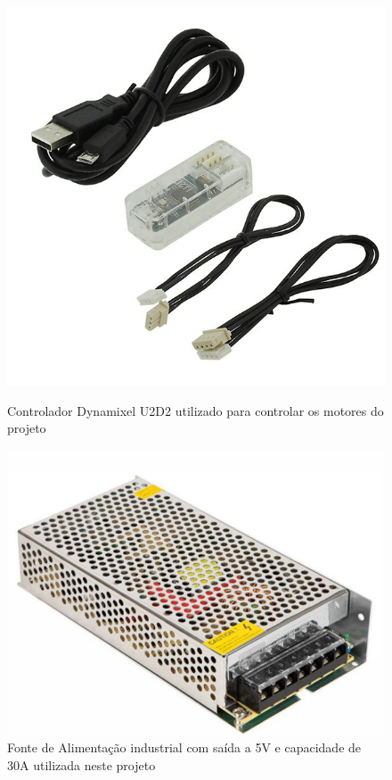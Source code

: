 \begin{figure}[H]
    \centering
    \begin{minipage}[b]{0.45\textwidth}
        \centering
        \includegraphics[width=\textwidth]{figs/chapter3/u2d2.jpg}
        \caption{Controlador Dynamixel U2D2 utilizado para controlar os motores do projeto}
        \label{fig:u2d2}
    \end{minipage}
    \hfill
    \begin{minipage}[b]{0.45\textwidth}
        \centering
        \includegraphics[width=\textwidth]{figs/chapter3/fonte.png}
        \caption{Fonte de Alimentação industrial com saída a 5V e capacidade de 30A utilizada neste projeto}
        \label{fig:fonte}
    \end{minipage}
\end{figure}


